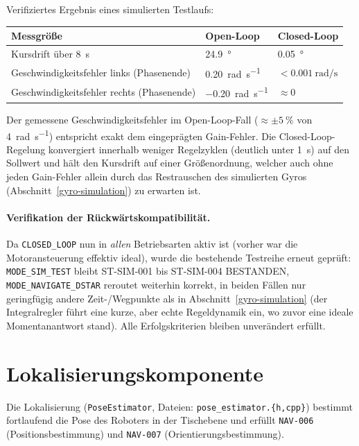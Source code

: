\documentclass[
  a4paper,
  12pt,
  DIV=12,        %
  parskip=half,  %
  headings=small %
]{scrartcl}
\theoremstyle{definition}
\theoremstyle{definition}
\begin{document}
Verifiziertes Ergebnis eines simulierten Testlaufs:

\begin{longtable}[]{@{}p{}p{}p{}@{}}
\toprule
\textbf{Messgröße} & \textbf{Open-Loop} & \textbf{Closed-Loop}\\
\midrule
\endhead
\bottomrule
\endfoot
Kursdrift über \SI{8}{\second} & \SI{24.9}{\degree} & \SI{0.05}{\degree}\\
Geschwindigkeitsfehler links (Phasenende) & \SI{0.20}{\radian\per\second} & $<\SI{0.001}{\radian\per\second}$\\
Geschwindigkeitsfehler rechts (Phasenende) & \SI{-0.20}{\radian\per\second} & $\approx \SI{0}{}$\\
\end{longtable}

Der gemessene Geschwindigkeitsfehler im Open-Loop-Fall
($\approx \pm\SI{5}{\percent}$ von \SI{4}{\radian\per\second}) entspricht
exakt dem eingeprägten Gain-Fehler. Die Closed-Loop-Regelung
konvergiert innerhalb weniger Regelzyklen (deutlich unter \SI{1}{\second})
auf den Sollwert und hält den Kursdrift auf einer Größenordnung, welcher auch
ohne jeden Gain-Fehler allein durch das Restrauschen des simulierten Gyros
(Abschnitt~\ref{gyro-simulation}) zu erwarten ist.

\paragraph{Verifikation der Rückwärtskompatibilität.} Da
\texttt{CLOSED\_LOOP} nun in \emph{allen} Betriebsarten aktiv ist (vorher
war die Motoransteuerung effektiv ideal), wurde die bestehende Testreihe
erneut geprüft: \texttt{MODE\_SIM\_TEST} bleibt ST-SIM-001 bis ST-SIM-004
BESTANDEN, \texttt{MODE\_NAVIGATE\_DSTAR} reroutet weiterhin korrekt, in
beiden Fällen nur geringfügig andere Zeit-/Wegpunkte als in
Abschnitt~\ref{gyro-simulation} (der Integralregler führt eine kurze,
aber echte Regeldynamik ein, wo zuvor eine ideale Momentanantwort stand).
Alle Erfolgskriterien bleiben unverändert erfüllt.

\section{Lokalisierungskomponente}\label{lokalisierung}

Die Lokalisierung (\texttt{PoseEstimator}, Dateien:
\texttt{pose\_estimator.\{h,cpp\}}) bestimmt fortlaufend die Pose des
Roboters in der Tischebene und erfüllt \texttt{NAV-006}
(Positionsbestimmung) und \texttt{NAV-007} (Orientierungsbestimmung).
\end{document}
